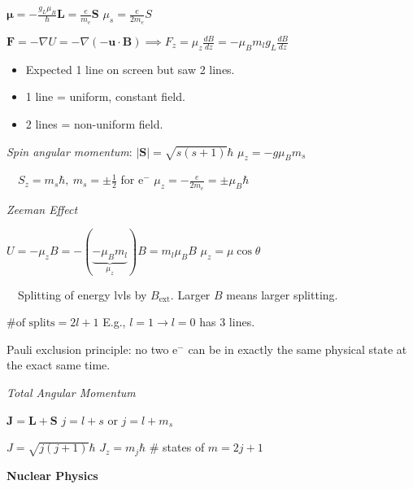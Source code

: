 \documentclass[twocolumn]{article}
\begin{document}
$\boldsymbol \mu = -\frac{g_L \mu_B}{\hbar} \mathbf L = \frac{e}{m_e} \mathbf S$ \hfill $\mu_s = \frac{e}{2m_e} S$

$\mathbf F = -\nabla U = -\nabla(-\mathbf u \cdot \mathbf B) \implies F_z = \mu_z \frac{dB}{dz} = -\mu_B m_l g_L \frac{dB}{dz}$

\vspace{-.5em} \begin{itemize}
    \item Expected 1 line on screen but saw 2 lines.
    \item 1 line = uniform, constant field.
    \item 2 lines = non-uniform field.
\end{itemize} \vspace{-.5em}


\textit{Spin angular momentum}: $|\mathbf{S}| = \sqrt{s(s+1)} \hbar$ \hfill $\mu_z = -g \mu_B m_s$

$\quad S_z = m_s \hbar,\ m_s = \pm\frac{1}{2}$ for e$^-$ \hfill $\mu_z = -\frac{e}{2m_e} = \pm \mu_B \hbar$

\vspace{-.5em}
\dotfill

\textit{Zeeman Effect}

$U = -\mu_z B = -(\underbrace{-\mu_B m_l}_{\mu_z})B = m_l \mu_B B$ \hfill $\mu_z = \mu \cos \theta$

$\quad$Splitting of energy lvls by $B_{\text{ext}}$. Larger $B$ means larger splitting.

$\text{\# of splits} = 2l+1$ \hfill E.g., $l=1 \to l=0$ has 3 lines.

Pauli exclusion principle: no two e$^-$ can be in exactly the same physical state at the exact same time.


\vspace{-.5em}
\dotfill

\textit{Total Angular Momentum}

$\mathbf J = \mathbf L + \mathbf S$ \hfill $j = l+s$ or $j = l + m_s$

$J = \sqrt{j(j+1)} \hbar$ \hfill $J_z = m_j \hbar$ \hfill \# states of $m = 2j+1$

\vspace{-.5em}
\dotfill

\textbf{Nuclear Physics}
\end{document}
